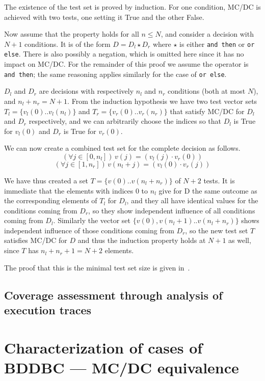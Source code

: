 \documentclass[a4paper,12pt,twoside]{article}
\renewcommand{\le}{\leqslant}
\newcommand{\anysc}{\star}
\newcommand{\andthen}{\texttt{and then}}
\newcommand{\orelse}{\texttt{or else}}
\begin{document}
The existence of the test set is proved by induction. For one condition,
MC/DC is achieved with two tests, one setting it True and the other False.

Now assume that the property holds for all $n \le{} N$, and consider a decision
with $N+1$ conditions. It is of the form $D = D_l \anysc{} D_r$ where
$\anysc{}$ is either \andthen{} or \orelse{}. There is also possibly a
negation, which is omitted here since it has no impact on MC/DC. For the
remainder of this proof we assume the operator is \andthen{}; the same
reasoning applies similarly for the case of \orelse{}.

$D_l$ and $D_r$ are decisions with respectively $n_l$ and $n_r$ conditions
(both at most $N$), and $n_l + n_r = N+1$. From the induction hypothesis
we have two test vector sets $T_l = \{ v_l (0) .. v_l (n_l) \}$ and
$T_r = \{ v_r (0) .. v_r (n_r) \}$ that satisfy MC/DC for $D_l$ and $D_r$
respectively, and we can arbitrarily choose the indices so that
$D_l$ is True for $v_l(0)$ and $D_r$ is True for $v_r (0)$.

We can now create a combined test set for the complete decision as follows.
$$(\forall j \in [0, n_l])\, v (j) = (v_l (j) \cdot v_r (0))$$
$$(\forall j \in [1, n_r])\, v (n_l + j) = (v_l (0) \cdot v_r (j))$$

We have thus created a set $T = \{ v(0) .. v(n_l + n_r) \}$ of $N+2$ tests.
It is immediate that the elements with indices 0 to $n_l$ give for D
the same outcome as the corresponding elements of $T_l$ for $D_l$,
and they all have identical values for the conditions coming from $D_r$,
so they show independent influence of all conditions coming from $D_l$.
Similarly the vector set $\{v(0), v(n_l+1) .. v(n_l + n_r)\}$ shows
independent influence of those conditions coming from $D_r$, so the new
test set $T$ satisfies MC/DC for $D$ and thus the induction property holds at
$N+1$ as well, since $T$ has $n_l + n_r + 1 = N+2$ elements.

The proof that this is the minimal test set size is given in~\cite{ar0118}.

\subsection{Coverage assessment through analysis of execution traces}


\section{Characterization of cases of BDDBC --- MC/DC equivalence}
\end{document}
